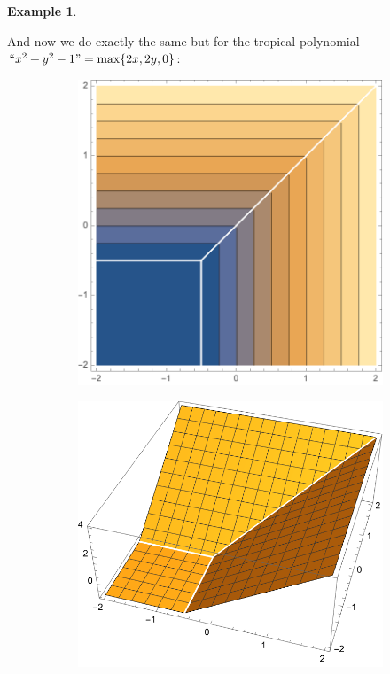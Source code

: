 \documentclass{article}
\theoremstyle{definition}
\newtheorem{ex}{Example}
\begin{document}
\begin{ex}
\begin{figure}[H]
\begin{subfigure}{.5\textwidth}
		\end{subfigure}
	\end{figure}
	And now we do exactly the same but for the tropical polynomial $``x^2+y^2-1"=\max\{2x,2y,0\}$:
	\begin{figure}[H]
		\begin{subfigure}{.5\textwidth}
			\centering
			\includegraphics[width=0.9\linewidth]{dani3}
		\end{subfigure}
		\begin{subfigure}{.5\textwidth}
			\centering
			\includegraphics[width=0.9\linewidth]{dani4}
		\end{subfigure}
	\end{figure}
\end{ex}
\end{document}
